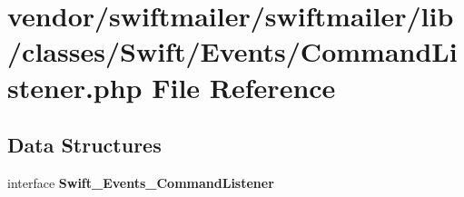 \section{vendor/swiftmailer/swiftmailer/lib/classes/\+Swift/\+Events/\+Command\+Listener.php File Reference}
\label{_command_listener_8php}
\subsection*{Data Structures}
\begin{DoxyCompactItemize}
\item 
interface {\bf Swift\+\_\+\+Events\+\_\+\+Command\+Listener}
\end{DoxyCompactItemize}
